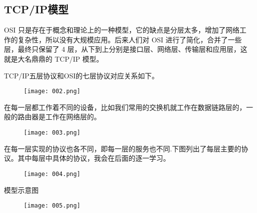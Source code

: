 \documentclass[cn,chinese,color=cyan]{elegantbook}
\begin{document}
\subsection{TCP/IP模型}
OSI 只是存在于概念和理论上的一种模型，它的缺点是分层太多，增加了网络工作的复杂性，所以没有大规模应用。后来人们对 OSI 进行了简化，合并了一些层，最终只保留了 4 层，从下到上分别是接口层、网络层、传输层和应用层，这就是大名鼎鼎的 TCP/IP 模型。

 TCP/IP五层协议和OSI的七层协议对应关系如下。
\begin{figure}[H]
	\centering
	\texttt{[image: 002.png]}
\end{figure}

在每一层都工作着不同的设备，比如我们常用的交换机就工作在数据链路层的，一般的路由器是工作在网络层的。
\begin{figure}[H]
	\centering
	\texttt{[image: 003.png]}
\end{figure}
在每一层实现的协议也各不同，即每一层的服务也不同.下图列出了每层主要的协议。其中每层中具体的协议，我会在后面的逐一学习。
\begin{figure}[H]
	\centering
	\texttt{[image: 004.png]}
\end{figure}

模型示意图
\begin{figure}[H]
	\centering
	\texttt{[image: 005.png]}
\end{figure}
\end{document}
